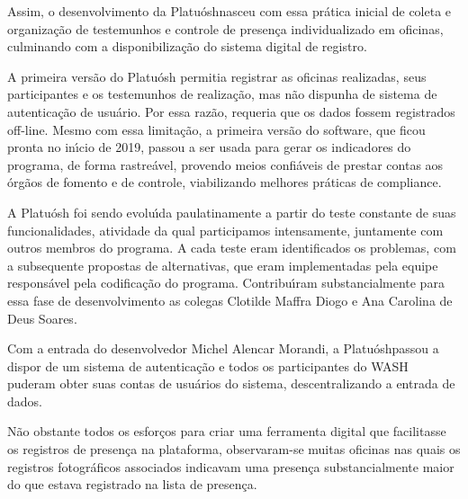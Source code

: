 \documentclass[
12pt,		%
openright,	%
twoside,  %
a4paper,			%
chapter=TITLE,		%
english,			%
french,				%
spanish,			%
brazil				%
]{USPSC-classe/USPSC}
\begin{document}
Assim, o desenvolvimento da \textquotedbl Platu\'osh\textquotedbl  nasceu com essa pr\'atica inicial de coleta e organiza\c{c}\~ao de testemunhos e controle de presen\c{c}a individualizado em oficinas, culminando com a disponibiliza\c{c}\~ao do sistema digital de registro.








A primeira vers\~ao do Platu\'osh permitia registrar as oficinas realizadas, seus participantes e os testemunhos de realiza\c{c}\~ao, mas n\~ao dispunha de sistema de autentica\c{c}\~ao de usu\'ario. Por essa raz\~ao, requeria que os dados fossem registrados off-line. Mesmo com essa limita\c{c}\~ao, a primeira vers\~ao do software, que ficou pronta no in\'{\i}cio de 2019, passou a ser usada para gerar os indicadores do programa, de forma rastre\'avel, provendo meios confi\'aveis de prestar contas aos \'org\~aos de fomento e de controle, viabilizando melhores pr\'aticas de \textquotedbl compliance\textquotedbl .








A Platu\'osh foi sendo evolu\'{\i}da paulatinamente a partir do teste constante de suas funcionalidades, atividade da qual participamos intensamente, juntamente com outros membros do programa. A cada teste eram identificados os problemas, com a subsequente propostas de alternativas, que eram implementadas pela equipe respons\'avel pela codifica\c{c}\~ao do programa. Contribu\'{\i}ram substancialmente para essa fase de desenvolvimento as colegas Clotilde Maffra Diogo e Ana Carolina de Deus Soares.








Com a entrada do desenvolvedor Michel Alencar Morandi, a \textquotedbl Platu\'osh\textquotedbl  passou a dispor de um sistema de autentica\c{c}\~ao e todos os participantes do WASH puderam obter suas \textquotedbl contas de usu\'arios do sistema\textquotedbl , descentralizando a entrada de dados.








N\~ao obstante todos os esfor\c{c}os para criar uma ferramenta digital que facilitasse os registros de presen\c{c}a na plataforma, observaram-se muitas oficinas nas quais os registros fotogr\'aficos associados indicavam uma presen\c{c}a substancialmente maior do que estava registrado na lista de presen\c{c}a.
\end{document}
